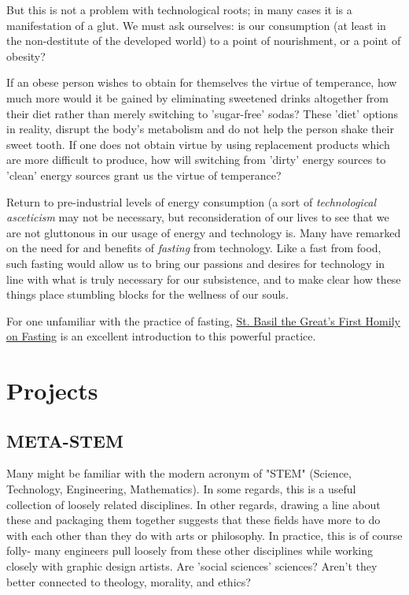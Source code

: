 \documentclass[letterpaper]{article}
\begin{document}
But this is not a problem with technological roots; in many cases it is a manifestation of a glut. We must ask ourselves: is our consumption (at least in the non-destitute of the developed world) to a point of nourishment, or a point of obesity?

If an obese person wishes to obtain for themselves the virtue of temperance, how much more would it be gained by eliminating sweetened drinks altogether from their diet rather than merely switching to 'sugar-free' sodas? These 'diet' options in reality, disrupt the body's metabolism and do not help the person shake their sweet tooth. If one does not obtain virtue by using replacement products which are more difficult to produce, how will switching from 'dirty' energy sources to 'clean' energy sources grant us the virtue of temperance?

Return to pre-industrial levels of energy consumption (a sort of \textit{technological asceticism} may not be necessary, but reconsideration of our lives to see that we are not gluttonous in our usage of energy and technology is. Many have remarked on the need for and benefits of \textit{fasting} from technology. Like a fast from food, such fasting would allow us to bring our passions and desires for technology in line with what is truly necessary for our subsistence, and to make clear how these things place stumbling blocks for the wellness of our souls. 

For one unfamiliar with the practice of fasting, \href{http://rutgersnb.occministries.org/wp-content/uploads/2015/07/St.-Basil-the-Great%E2%80%99s-First-Homily-on-Fasting.pdf}{St. Basil the Great's First Homily on Fasting} is an excellent introduction to this powerful practice. 

\section{Projects}

\subsection{META-STEM}

Many might be familiar with the modern acronym of "STEM" (Science, Technology, Engineering, Mathematics). In some regards, this is a useful collection of loosely related disciplines. In other regards, drawing a line about these and packaging them together suggests that these fields have more to do with each other than they do with arts or philosophy. In practice, this is of course folly- many engineers pull loosely from these other disciplines while working closely with graphic design artists. Are 'social sciences' sciences? Aren't they better connected to theology, morality, and ethics?
\end{document}
